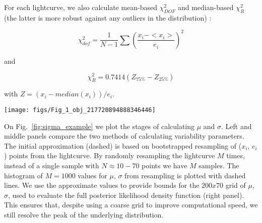 \documentclass[fleqn,usenatbib]{mnras}  %
\begin{document}
For each lightcurve, we also calculate mean-based $\chi^{2}_{DOF}$ and median-based $\chi^{2}_{R}$ (the latter is more robust against any outliers in the distribution) : 

\begin{equation}
\label{eqn:chi2DOF}
\chi^{2}_{dof} = \frac{1}{N-1}\sum{\left( \frac{x_{i} - <x_{i}>} {e_{i}} \right) ^{2}}
\end{equation}

\noindent and
 
\begin{equation}
\label{eqn:chi2R}
\chi^{2}_{R} = 0.7414 (Z_{75\%} - Z_{25\%} ) 
\end{equation}

\noindent with $Z=(x_{i} - median(x_{i})) / e_{i} $. 
\bigskip

\begin{figure*}
\label{fig:sigma_example}
\texttt{[image: figs/Fig\_1\_obj\_217720894888346446]}
\cprotect\caption{Two-step approach to finding $\mu$ and $\sigma$ via $\mu_{0}$ and $\sigma_{0}$ for an object 217720894888346446. In this calculation we use raw psf flux, before employing the faint source treatment outlined in Section~\ref{sec:faint_sources}. On the left and middle panels,  solid lines trace marginalized posterior pdfs for $\mu$ and $\sigma$ , while dashed lines depict histogram distributions of 10,000 bootstrap resamples for $\mu_{0}$ and $\sigma_{0}$. The right panel shows the logarithm of the posterior probability density function for $\mu$ and $\sigma$.}
\end{figure*}

On Fig.~\ref{fig:sigma_example} we plot the stages of calculating $\mu$ and $\sigma$. Left and middle panels compare the two methods of calculating variability parameters. The initial approximation (dashed) is based on bootstrapped resampling of ($x_i$, $e_i$) points from  the lightcurve. By randomly resampling the lightcurve $M$ times, instead of a single sample with $N \approx 10-70 $ points  we have $M$ samples. The histogram of  $M=1000$ values for $\mu$, $\sigma$ from resampling is plotted with dashed lines. 
We use the approximate values to provide bounds for the $200 x 70$ grid of $\mu$, $\sigma$, used to evaluate the full posterior likelihood density function (right panel). This ensures that, despite using a coarse grid to improve computational speed,  we still resolve the peak of the underlying distribution. 
\end{document}
